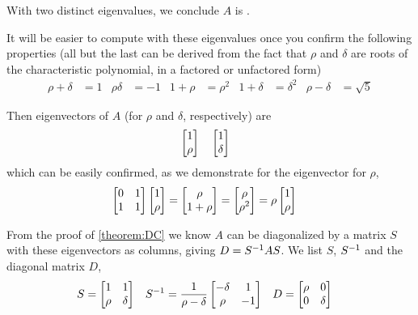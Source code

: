 \documentclass{ximera}
\begin{document}
\begin{example}
\begin{question}
With two distinct eigenvalues, we conclude $A$ is
.
\end{question}

It will be easier to compute with these eigenvalues
once you confirm the following properties (all but the last can be
derived from the fact that $\rho$ and $\delta$ are roots of the
characteristic polynomial, in a factored or unfactored form)
\begin{align*}
\rho+\delta&=1
&
\rho\delta&=-1
&
1+\rho&=\rho^2
&
1+\delta&=\delta^2
&
\rho-\delta&=\sqrt{5}
\end{align*}

Then eigenvectors of $A$ (for $\rho$ and $\delta$, respectively) are
\begin{align*}
&\begin{bmatrix}1\\\rho\end{bmatrix}
&
&\begin{bmatrix}1\\\delta\end{bmatrix}
\end{align*}
which can be easily confirmed, as we demonstrate for the eigenvector for $\rho$,
\begin{align*}
\begin{bmatrix}0&1\\1&1\end{bmatrix}\begin{bmatrix}1\\\rho\end{bmatrix}
&
=\begin{bmatrix}\rho\\1+\rho\end{bmatrix}
=\begin{bmatrix}\rho\\\rho^2\end{bmatrix}
=\rho\begin{bmatrix}1\\\rho\end{bmatrix}
\end{align*}

From the proof of \ref{theorem:DC} we know $A$ can be diagonalized by a matrix $S$ with these eigenvectors as columns, giving $D=S^{-1}AS$.  We list $S$, $S^{-1}$ and the diagonal matrix $D$,
\begin{align*}
S&=\begin{bmatrix}1&1\\\rho&\delta\end{bmatrix}
&
S^{-1}&=\frac{1}{\rho-\delta}\begin{bmatrix}-\delta&1\\\rho&-1\end{bmatrix}
&
D&=\begin{bmatrix}\rho&0\\0&\delta\end{bmatrix}
\end{align*}


\end{example}
\end{document}
